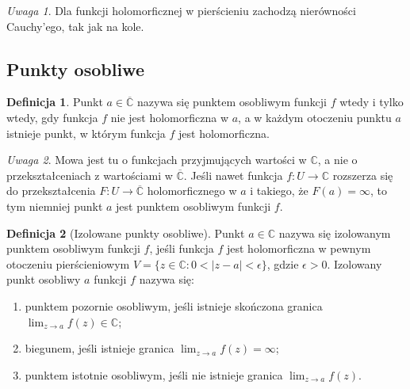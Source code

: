 \documentclass[11pt]{article}
\newcommand{\abs}[1]{\left|#1\right|} %
\newcommand{\extcomplex}{\overline{\mathbb{C}}} %
\theoremstyle{plain}
\theoremstyle{definition}
\newtheorem*{definition}{Definicja}
\theoremstyle{remark}
\newtheorem*{remark}{Uwaga}
\begin{document}
\begin{remark}
  Dla funkcji holomorficznej w pierścieniu zachodzą nierówności Cauchy'ego, tak jak na kole.
\end{remark}


\subsection{Punkty osobliwe}

\begin{definition}
  Punkt $ a \in \extcomplex $ nazywa się punktem osobliwym funkcji $f$ wtedy i tylko wtedy,
  gdy funkcja $f$ nie jest holomorficzna w $a$,
  a w każdym otoczeniu punktu $a$ istnieje punkt, w którym funkcja $f$ jest holomorficzna.
\end{definition}

\begin{remark}
  Mowa jest tu o funkcjach przyjmujących wartości w $ \mathbb{C} $, a nie o przekształceniach z wartościami w $ \extcomplex $.
  Jeśli nawet funkcja $ f: U \to \mathbb{C} $ rozszerza się do przekształcenia $ F: U \to \extcomplex $ holomorficznego w $a$ i takiego,
  że $ F(a) = \infty $, to tym niemniej punkt $a$ jest punktem osobliwym funkcji $f$.
\end{remark}

\begin{definition}[Izolowane punkty osobliwe]
  Punkt $ a \in \mathbb{C} $ nazywa się izolowanym punktem osobliwym funkcji $f$,
  jeśli funkcja $f$ jest holomorficzna w pewnym otoczeniu pierścieniowym $ V = \{ z \in \mathbb{C}: 0 < \abs{z-a} < \epsilon \} $, gdzie $ \epsilon > 0 $.
  Izolowany punkt osobliwy $a$ funkcji $f$ nazywa się:

  \begin{enumerate}
    \item punktem pozornie osobliwym, jeśli istnieje skończona granica $ \lim_{z \to a} f(z) \in \mathbb{C} $;
    \item biegunem, jeśli istnieje granica $ \lim_{z \to a} f(z) = \infty $;
    \item punktem istotnie osobliwym, jeśli nie istnieje granica $ \lim_{z \to a} f(z) $.
  \end{enumerate}
\end{definition}
\end{document}
